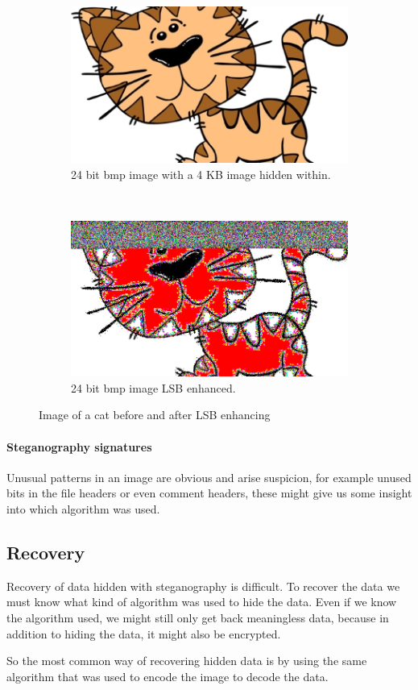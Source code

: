 \begin{figure}
    \centering
    \begin{subfigure}[b]{0.45\textwidth}
		\includegraphics[width=\textwidth]{figures/cat.jpg}
		\caption{24 bit bmp image with a 4 KB image hidden within. \citep{imgCat}}
		\label{fig:hiddenCat}
	\end{subfigure}
	~
	\begin{subfigure}[b]{0.45\textwidth}
		\includegraphics[width=\textwidth]{figures/Cat_LSBEnhanced.png}
		\caption{24 bit bmp image LSB enhanced. \newline}
		\label{fig:LSBenhanced}
	\end{subfigure}
	\caption{Image of a cat before and after LSB enhancing}
\end{figure}

\paragraph*{Steganography signatures}
Unusual patterns in an image are obvious and arise suspicion, for example unused bits in the file headers or even comment headers, these might give us some insight into which algorithm was used.

\subsection{Recovery}
Recovery of data hidden with steganography is difficult. To recover the data we must know what kind of algorithm was used to hide the data.
Even if we know the algorithm used, we might still only get back meaningless data, because in addition to hiding the data, it might also be encrypted.

So the most common way of recovering hidden data is by using the same algorithm that was used to encode the image to decode the data.
